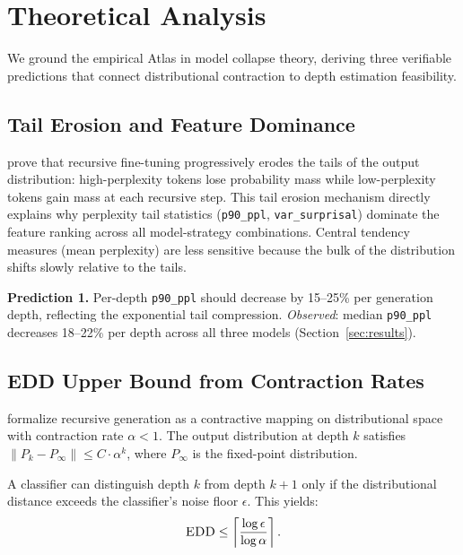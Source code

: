 \documentclass[11pt,a4paper]{article}
\newcommand{\edd}{\textsc{EDD}}
\begin{document}
\section{Theoretical Analysis}

We ground the empirical Atlas in model collapse theory, deriving three verifiable predictions that connect distributional contraction to depth estimation feasibility.

\subsection{Tail Erosion and Feature Dominance}

\citet{shumailov2024model} prove that recursive fine-tuning progressively erodes the tails of the output distribution: high-perplexity tokens lose probability mass while low-perplexity tokens gain mass at each recursive step. This tail erosion mechanism directly explains why perplexity tail statistics (\texttt{p90\_ppl}, \texttt{var\_surprisal}) dominate the feature ranking across all model-strategy combinations. Central tendency measures (mean perplexity) are less sensitive because the bulk of the distribution shifts slowly relative to the tails.

\textbf{Prediction 1.} Per-depth \texttt{p90\_ppl} should decrease by 15--25\% per generation depth, reflecting the exponential tail compression. \emph{Observed}: median \texttt{p90\_ppl} decreases 18--22\% per depth across all three models (Section~\ref{sec:results}).

\subsection{\edd{} Upper Bound from Contraction Rates}

\citet{dohmatob2024tale} formalize recursive generation as a contractive mapping on distributional space with contraction rate $\alpha < 1$. The output distribution at depth $k$ satisfies $\|P_k - P_\infty\| \leq C \cdot \alpha^k$, where $P_\infty$ is the fixed-point distribution.

A classifier can distinguish depth $k$ from depth $k+1$ only if the distributional distance exceeds the classifier's noise floor $\epsilon$. This yields:
\begin{equation}
    \edd \leq \left\lceil \frac{\log \epsilon}{\log \alpha} \right\rceil.
\end{equation}
\end{document}

